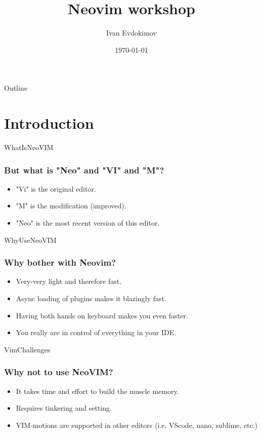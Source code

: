 \documentclass{beamer}
\title{Neovim workshop}
\author{Ivan Evdokimov}
\date{\today}
\begin{document}
\begin{frame}
    \titlepage
\end{frame}

\begin{frame}{Outline}
    \begingroup
    \tableofcontents
    \endgroup
\end{frame}

\section{Introduction}
\begin{frame}{WhatIsNeoVIM}
    \frametitle{But what is "Neo" and "VI" and "M"?}
    \begin{itemize}
        \item "Vi" is the original editor.
        \item "M" is the modification (improved).
        \item "Neo" is the most recent version of this editor.
    \end{itemize}
\end{frame}

\begin{frame}{WhyUseNeoVIM}
    \frametitle{Why bother with Neovim?}
    \begin{itemize}
        \item Very-very light and therefore fast.
        \item Async loading of plugins makes it blazingly fast.
        \item Having both hands on keyboard makes you even faster.
        \item You really are in control of everything in your IDE.
    \end{itemize}
\end{frame}

\begin{frame}{VimChallenges}
    \frametitle{Why \textbf{not} to use NeoVIM?}
    \begin{itemize}
        \item It takes time and effort to build the muscle memory.
        \item Requires tinkering and setting.
        \item VIM-motions are supported in other editors (i.e. VScode, nano, sublime, etc.)
    \end{itemize}
\end{frame}
\end{document}

